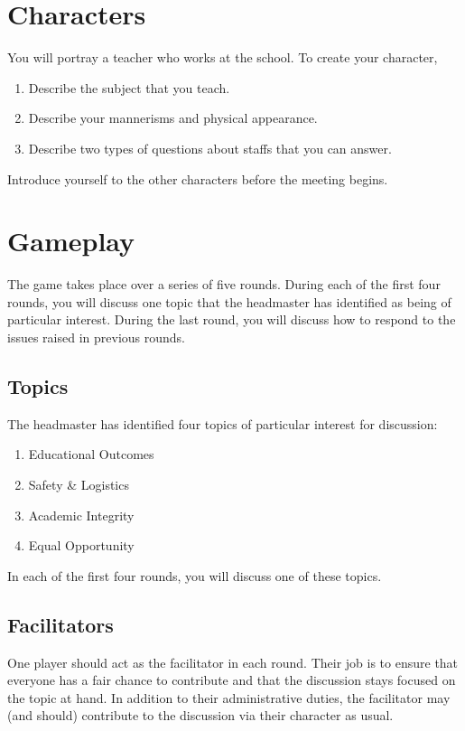 \documentclass[a6paper, 11pt, parskip=half]{scrartcl}
\begin{document}
\section*{Characters}
You will portray a teacher who works at the school. To create your character,
\begin{enumerate}[nosep]
	\item Describe the subject that you teach.
	\item Describe your mannerisms and physical appearance.
	\item Describe two types of questions about staffs that you can answer.
\end{enumerate}
Introduce yourself to the other characters before the meeting begins.

\section*{Gameplay}
The game takes place over a series of five rounds. 
During each of the first four rounds, you will discuss one topic that the headmaster has identified as being of particular interest.
During the last round, you will discuss how to respond to the issues raised in previous rounds. 

\newpage
\enlargethispage{3.5\baselineskip}

\subsection*{Topics}
The headmaster has identified four topics of particular interest for discussion:
\begin{enumerate}[nosep]
	\item Educational Outcomes
	\item Safety \& Logistics
	\item Academic Integrity
	\item Equal Opportunity
\end{enumerate}
In each of the first four rounds, you will discuss one of these topics.

\subsection*{Facilitators}
One player should act as the facilitator in each round. Their job is to ensure that everyone has a fair chance to contribute and that the discussion stays focused on the topic at hand. In addition to their administrative duties, the facilitator may (and should) contribute to the discussion via their character as usual. 
\end{document}
